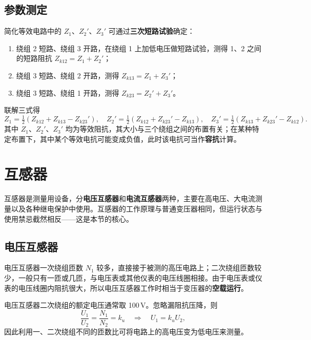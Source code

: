 \subsection{参数测定}
简化等效电路中的 $Z_1$、$Z_2'$、$Z_3'$ 可通过\textbf{三次短路试验}确定：
\begin{enumerate}
  \item 绕组 2 短路、绕组 3 开路，在绕组 1 上加低电压做短路试验，测得 1、2 之间的短路阻抗 $Z_{k12}=Z_1+Z_2'$；
  \item 绕组 3 短路、绕组 2 开路，测得 $Z_{k13}=Z_1+Z_3'$；
  \item 绕组 3 短路、绕组 1 开路，测得 $Z_{k23}=Z_2'+Z_3'$。
\end{enumerate}
联解三式得
\begin{equation}
Z_1=\tfrac12\left(Z_{k12}+Z_{k13}-Z_{k23}'\right),\quad
Z_2'=\tfrac12\left(Z_{k12}+Z_{k23}'-Z_{k13}\right),\quad
Z_3'=\tfrac12\left(Z_{k13}+Z_{k23}'-Z_{k12}\right).
\end{equation}
其中 $Z_1$、$Z_2'$、$Z_3'$ 均为等效阻抗，其大小与三个绕组之间的布置有关；在某种特定布置下，其中某个等效电抗可能变成负值，此时该电抗可当作\textbf{容抗}计算。


\section{互感器}

互感器是测量用设备，分\textbf{电压互感器}和\textbf{电流互感器}两种，主要在高电压、大电流测量以及各种继电保护中使用。互感器的工作原理与普通变压器相同，但运行状态与使用禁忌截然相反——这是本节的核心。

\subsection{电压互感器}
电压互感器一次绕组匝数 $N_1$ 较多，直接接于被测的高压电路上；二次绕组匝数较少，一般只有一匝或几匝，与电压表或其他仪表的电压线圈相接。由于电压表或仪表的电压线圈内阻抗很大，所以电压互感器工作时相当于变压器的\textbf{空载运行}。

电压互感器二次绕组的额定电压通常取 100\,V。忽略漏阻抗压降，则
\begin{equation}
\frac{U_1}{U_2}=\frac{N_1}{N_2}=k_u\quad\Longrightarrow\quad U_1=k_uU_2 ,
\end{equation}
因此利用一、二次绕组不同的匝数比可将电路上的高电压变为低电压来测量。

